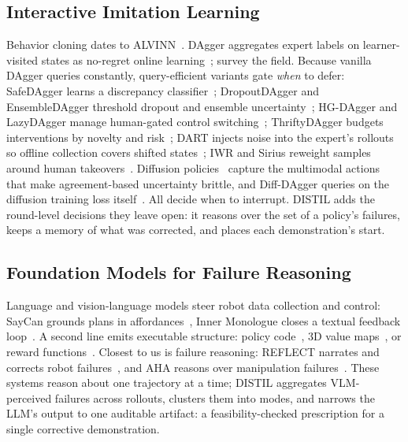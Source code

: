 \documentclass[letterpaper]{article} %
\begin{document}
\subsection{Interactive Imitation Learning}
Behavior cloning dates to ALVINN~\citep{pomerleau1988alvinn}. DAgger
aggregates expert labels on
learner-visited states as no-regret online
learning~\citep{ross2011dagger}; \citet{celemin2022iil} survey the field. Because vanilla DAgger queries
constantly, query-efficient variants gate \emph{when} to defer: SafeDAgger
learns a discrepancy classifier~\citep{zhang2017safedagger}; DropoutDAgger and
EnsembleDAgger threshold dropout and ensemble
uncertainty~\citep{menda2017dropoutdagger,menda2019ensembledagger}; HG-DAgger and LazyDAgger manage human-gated
control switching~\citep{kelly2019hgdagger,hoque2021lazydagger};
ThriftyDAgger budgets interventions by novelty and
risk~\citep{hoque2021thriftydagger}; DART injects noise into the expert's rollouts so offline
collection covers shifted states~\citep{laskey2017dart}; IWR and Sirius reweight samples
around human takeovers~\citep{mandlekar2020iwr,liu2023sirius}. Diffusion
policies~\citep{chi2023diffusionpolicy,ho2020ddpm} capture
the multimodal actions that make agreement-based uncertainty brittle, and
Diff-DAgger queries on the diffusion training loss
itself~\citep{lee2025diffdagger}. All decide when to interrupt. DISTIL adds
the round-level decisions they leave open: it reasons over the set of a
policy's failures, keeps a memory of what was corrected, and places each
demonstration's start.

\subsection{Foundation Models for Failure Reasoning}
Language and vision-language models steer robot data collection and
control: SayCan grounds plans in affordances~\citep{ahn2022saycan}, Inner
Monologue closes a textual feedback loop~\citep{huang2022innermonologue}.
A second line emits executable structure: policy
code~\citep{liang2023codeaspolicies}, 3D value
maps~\citep{huang2023voxposer}, or reward
functions~\citep{ma2024eureka}. Closest to us is
failure reasoning: REFLECT narrates and corrects robot
failures~\citep{liu2023reflect}, and AHA reasons over manipulation
failures~\citep{duan2025aha}. These systems reason
about one trajectory at a time; DISTIL aggregates VLM-perceived failures
across rollouts, clusters them into modes, and narrows the LLM's output to
one auditable artifact: a feasibility-checked prescription for a single
corrective demonstration.
\end{document}
